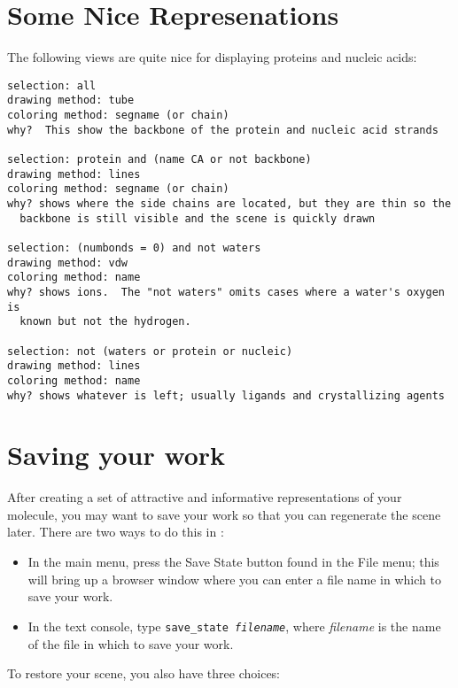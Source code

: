 \section{Some Nice Represenations}
The following views are quite nice for displaying proteins and nucleic
acids:

\begin{verbatim}
selection: all
drawing method: tube
coloring method: segname (or chain)
why?  This show the backbone of the protein and nucleic acid strands

selection: protein and (name CA or not backbone)
drawing method: lines
coloring method: segname (or chain)
why? shows where the side chains are located, but they are thin so the
  backbone is still visible and the scene is quickly drawn

selection: (numbonds = 0) and not waters
drawing method: vdw
coloring method: name
why? shows ions.  The "not waters" omits cases where a water's oxygen is
  known but not the hydrogen.

selection: not (waters or protein or nucleic)
drawing method: lines
coloring method: name
why? shows whatever is left; usually ligands and crystallizing agents
\end{verbatim}



\section{Saving your work}
\label{ug:scripts:savestate}

After creating a set of attractive and informative representations of your
molecule, you may want to save your work so that you can regenerate the 
scene later.  There are two ways to do this in \VMD:
\begin{itemize}
\item In the main menu, press the {\sf Save State} button found in the 
{\sf File} menu; this will bring up
a browser window where you can enter a file name in which to save your work.

\item In the text console, type {\tt save\_state {\it filename}}, where
{\it filename} is the name of the file in which to save your work.

\end{itemize}

To restore your scene, you also have three choices:

